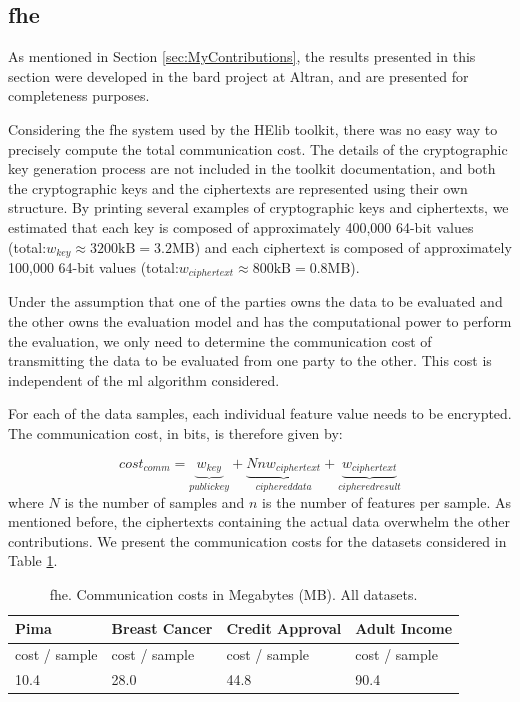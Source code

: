 \subsection{\acl{fhe}}
\label{ssec:comm_fhe}

As mentioned in Section \ref{sec:MyContributions}, the results presented in this section were developed in the \ac{bard} project at Altran, and are presented for completeness purposes.

Considering the \ac{fhe} system used by the HElib toolkit, there was no easy way to precisely compute the total communication cost. The details of the cryptographic key generation process are not included in the toolkit documentation, and both the cryptographic keys and the ciphertexts are represented using their own structure. By printing several examples of cryptographic keys and ciphertexts, we estimated that each key is composed of approximately 400,000 64-bit values (total:$w_{key}\approx 3200\text{kB}=3.2\text{MB}$) and each ciphertext is composed of approximately 100,000 64-bit values (total:$w_{ciphertext}\approx 800\text{kB}=0.8\text{MB}$).

Under the assumption that one of the parties owns the data to be evaluated and the other owns the evaluation model and has the computational power to perform the evaluation, we only need to determine the communication cost of transmitting the data to be evaluated from one party to the other. This cost is independent of the \ac{ml} algorithm considered.

For each of the data samples, each individual feature value needs to be encrypted. The communication cost, in bits, is therefore given by:

\begin{equation}
\label{eq:FHE_commCost}
cost_{comm} = \underbrace{w_{key}}_{public key} + \underbrace{Nnw_{ciphertext}}_{ciphered data} + \underbrace{w_{ciphertext}}_{ciphered result}
\end{equation}
where $N$ is the number of samples and $n$ is the number of features per sample. As mentioned before, the ciphertexts containing the actual data overwhelm the other contributions. We present the communication costs for the datasets considered in Table \ref{table:FHECommCost}.


\begin{table}[htp]
\centering
\caption{\acs{fhe}. Communication costs in Megabytes (MB). All datasets.}
\label{table:FHECommCost}
\begin{tabular}{|l|l|l|l|}
\hline
\textbf{Pima}          & \textbf{Breast Cancer} & \textbf{Credit Approval} & \textbf{Adult Income}   \\ \hline
cost / sample & cost / sample & cost / sample   & cost / sample  \\ \hline
10.4   & 28.0  & 44.8  & 90.4   \\ \hline
\end{tabular}
\end{table}


